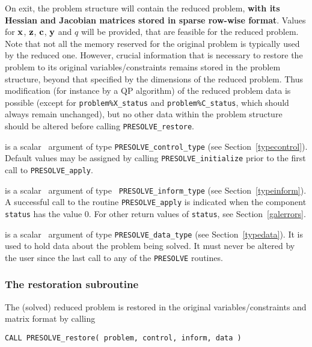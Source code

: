 \documentclass{galahad}
\newcommand{\packagename}{PRESOLVE}
\begin{document}
\begin{description}
\noindent
On exit, the problem structure will contain the reduced problem, {\bf with its
Hessian and Jacobian matrices stored in sparse row-wise format}. 
Values for ${\mathbf{x}}$, ${\mathbf{z}}$, ${\mathbf{c}}$, ${\mathbf{y}}$ and $q$ will be provided, that are
feasible for the reduced problem. Note that not
all the memory reserved for the original problem is typically used by the
reduced one.  However, crucial information that is necessary to restore the
problem to its original variables/constraints remains stored in the problem
structure, beyond that specified by the dimensions of the reduced problem.
Thus modification (for instance by a QP algorithm) of the reduced problem data 
is possible (except for {\tt problem\%X\_status} and {\tt problem\%C\_status},
which should always remain unchanged), but no other data within the problem
structure should be altered before calling {\tt \packagename\_restore}.

 is a scalar \intentin\ argument of type 
{\tt \packagename\_control\_type}
(see Section~\ref{typecontrol}). Default values may be assigned by calling 
{\tt \packagename\_initialize} prior to the first call to 
{\tt \packagename\_apply}.

 is a scalar \intentout\ argument of type {\tt
\packagename\_inform\_type} 
(see Section~\ref{typeinform}). A successful call to the routine
{\tt \packagename\_apply}
is indicated when the  component {\tt status} has the value 0. 
For other return values of {\tt status}, see Section~\ref{galerrors}.

 is a scalar \intentinout\ argument of type 
{\tt \packagename\_data\_type}
(see Section~\ref{typedata}). It is used to hold data about the problem being 
solved. It must never be  altered by the user since the last call to 
any of the {\tt \packagename} routines.

\end{description}


\subsubsection{The restoration subroutine}

The (solved) reduced problem is restored in the original variables/constraints
and matrix format by calling
\vspace*{1mm}

\hspace{8mm}
{\tt CALL \packagename\_restore( problem, control, inform, data )}
\end{document}
